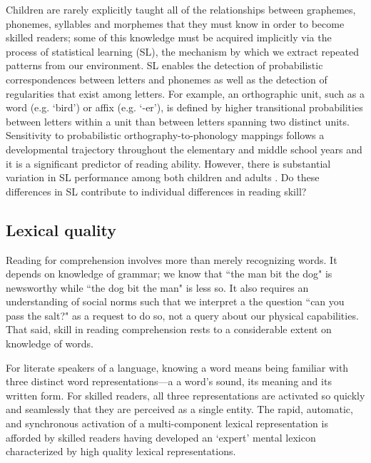 \documentclass[review]{elsarticle}
\begin{document}
Children are rarely explicitly taught all of the relationships between graphemes, phonemes, syllables and morphemes that they must know in order to become skilled readers; some of this knowledge must be acquired implicitly via the process of  statistical learning (SL), the mechanism by which we extract repeated patterns from our environment. SL enables the detection of probabilistic correspondences between letters and phonemes as well as the detection of regularities that exist among letters. For example, an orthographic unit, such as a word (e.g. `bird') or affix (e.g. `-er'), is defined by higher transitional probabilities between letters within a unit than between letters spanning two distinct units. Sensitivity to probabilistic orthography-to-phonology mappings follows a developmental trajectory throughout the elementary and middle school years \citep{treimanSpellingStatisticalLearning2006} and  it is  a significant predictor of reading ability. However, there is substantial variation in SL performance among both children and adults \citep{arciuliStatisticalLearningRelated2012}.   Do these differences in SL contribute to individual differences in  reading skill?

\subsection{Lexical quality}

Reading for comprehension involves more than merely recognizing words. It depends on knowledge of grammar; we know that ``the man bit the dog" is newsworthy while ``the dog bit the man" is less so.  It also requires an understanding of social norms such that we interpret a the question ``can you pass the salt?" as a request to do so, not a query about our physical capabilities.  That said, skill in reading comprehension rests to a considerable extent on knowledge of words.

For literate speakers of a language, knowing a word means being familiar with three distinct word representations—a a word's sound, its meaning and its written form. For skilled readers,  all three representations are activated so quickly and seamlessly that they are perceived as a single entity. The rapid, automatic, and synchronous activation of a multi-component lexical representation is afforded by skilled readers having developed an `expert' mental lexicon characterized by high quality lexical representations.
\end{document}

